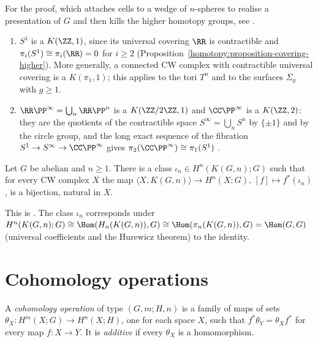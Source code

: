 For the proof, which attaches cells to a wedge of $n$-spheres to realise a presentation of $G$ and then kills the higher homotopy groups, see \cite[Section 4.2]{hatcher-at}.

\begin{example}\label{cohomology-operations:example-eilenberg-maclane}
\begin{enumerate}
\item $S^1$ is a $K(\ZZ, 1)$, since its universal covering $\RR$ is contractible and $\pi_i(S^1) \cong \pi_i(\RR) = 0$ for $i \geq 2$
(Proposition~\ref{homotopy:proposition-covering-higher}). More generally, a connected CW complex with contractible universal covering is a $K(\pi_1, 1)$; this applies
to the tori $T^n$ and to the surfaces $\Sigma_g$ with $g \geq 1$.
\item $\RR\PP^\infty = \bigcup_n \RR\PP^n$ is a $K(\ZZ/2\ZZ, 1)$ and $\CC\PP^\infty$ is a $K(\ZZ, 2)$: they are the quotients of the contractible space
$S^\infty = \bigcup_n S^n$ by $\{\pm 1\}$ and by the circle group, and the long exact sequence of the fibration $S^1 \to S^\infty \to \CC\PP^\infty$ gives
$\pi_2(\CC\PP^\infty) \cong \pi_1(S^1)$ \cite[Section 4.2]{hatcher-at}.
\end{enumerate}
\end{example}

\begin{theorem}[Representability]\label{cohomology-operations:theorem-representability}
Let $G$ be abelian and $n \geq 1$. There is a class $\iota_n \in H^n(K(G, n); G)$ such that for every CW complex $X$ the map $\langle X, K(G, n) \rangle \to H^n(X; G)$,
$[f] \mapsto f^*(\iota_n)$, is a bijection, natural in $X$.
\end{theorem}

This is \cite[Theorem 4.57]{hatcher-at}. The class $\iota_n$ corresponds under $H^n(K(G, n); G) \cong \Hom(H_n(K(G, n)), G) \cong \Hom(\pi_n(K(G, n)), G) = \Hom(G, G)$
(universal coefficients and the Hurewicz theorem) to the identity.

\section{Cohomology operations}\label{cohomology-operations:section-operations}

\begin{definition}\label{cohomology-operations:definition-operation}
A \emph{cohomology operation} of type $(G, m; H, n)$ is a family of maps of sets $\theta_X \colon H^m(X; G) \to H^n(X; H)$, one for each space $X$, such that
$f^*\theta_Y = \theta_X f^*$ for every map $f \colon X \to Y$. It is \emph{additive} if every $\theta_X$ is a homomorphism.
\end{definition}

